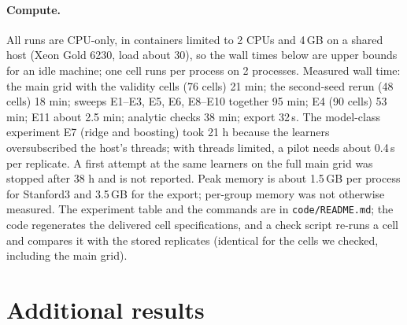 \paragraph{Compute.} All runs are CPU-only, in containers limited to 2 CPUs and 4\,GB on a shared host (Xeon Gold 6230, load about 30), so the wall times below are upper bounds for an idle machine; one cell runs per process on 2 processes. Measured wall time: the main grid with the validity cells (76 cells) 21 min; the second-seed rerun (48 cells) 18 min; sweeps E1--E3, E5, E6, E8--E10 together 95 min; E4 (90 cells) 53 min; E11 about 2.5 min; analytic checks 38 min; export 32\,s. The model-class experiment E7 (ridge and boosting) took 21 h because the learners oversubscribed the host's threads; with threads limited, a pilot needs about 0.4\,s per replicate. A first attempt at the same learners on the full main grid was stopped after 38 h and is not reported. Peak memory is about 1.5\,GB per process for Stanford3 and 3.5\,GB for the export; per-group memory was not otherwise measured. The experiment table and the commands are in \texttt{code/README.md}; the code regenerates the delivered cell specifications, and a check script re-runs a cell and compares it with the stored replicates (identical for the cells we checked, including the main grid).
\begin{table}[H]
\centering\small
\caption{Setup of the main grid.}
\label{tab:setup}

\end{table}

\section{Additional results}
\label{app:extra}
